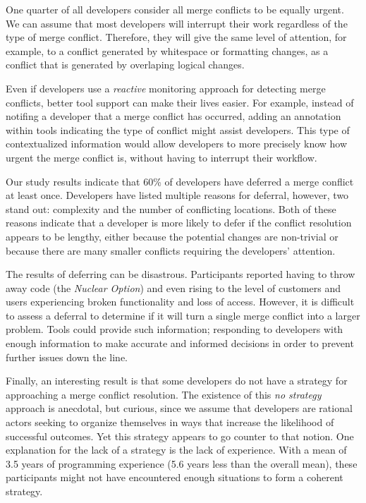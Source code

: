 One quarter of all developers consider all merge conflicts to be equally urgent.
We can assume that most developers will interrupt their work regardless of the type of merge conflict.
Therefore, they will give the same level of attention, for example, to a conflict generated by whitespace or formatting changes, as a conflict that is generated by overlaping logical changes. 

Even if developers use a \emph{reactive} monitoring approach for detecting merge conflicts, better tool support can make their lives easier.
For example, instead of notifing a developer that a merge conflict has occurred, adding an annotation within tools indicating the type of conflict might assist developers.
This type of contextualized information would allow developers to more precisely know how urgent the merge conflict is, without having to interrupt their workflow.

Our study results indicate that 60\% of developers have deferred a merge conflict at least once. 
Developers have listed multiple reasons for deferral, however, two stand out: complexity and the number of conflicting locations.
Both of these reasons indicate that a developer is more likely to defer if the conflict resolution appears to be lengthy, either because the potential changes are non-trivial or because there are many smaller conflicts requiring the developers' attention.

The results of deferring can be disastrous. 
Participants reported having to throw away code (the \emph{Nuclear Option}) and even rising to the level of
customers and users experiencing broken functionality and loss of access.
However, it is difficult to assess a deferral to determine if it will turn a single merge conflict into a larger problem.
Tools could provide such information; responding to developers with enough information to make accurate and informed decisions in order to prevent further issues down the line.

Finally, an interesting result is that some developers do not have a strategy for approaching a merge conflict resolution.
The existence of this \textit{no strategy} approach is anecdotal, but curious, since we assume that developers are rational actors seeking to organize themselves in ways that increase the likelihood of successful outcomes.
Yet this strategy appears to go counter to that notion.
One explanation for the lack of a strategy is the lack of experience.
With a mean of 3.5 years of programming experience (5.6 years less than the overall mean), these participants might not have encountered enough situations to form a coherent strategy.

